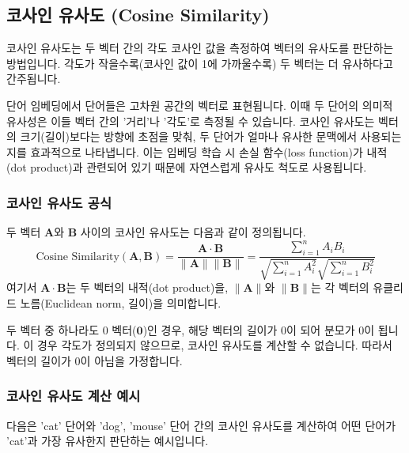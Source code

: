 \documentclass[11pt,a4paper]{article}
\begin{document}
\newpage
\subsection{코사인 유사도 (Cosine Similarity)}
코사인 유사도는 두 벡터 간의 각도 코사인 값을 측정하여 벡터의 유사도를 판단하는 방법입니다. 각도가 작을수록(코사인 값이 1에 가까울수록) 두 벡터는 더 유사하다고 간주됩니다.

\begin{tcolorbox}[title=\textbf{코사인 유사도의 중요성}]
단어 임베딩에서 단어들은 고차원 공간의 벡터로 표현됩니다. 이때 두 단어의 의미적 유사성은 이들 벡터 간의 '거리'나 '각도'로 측정될 수 있습니다. 코사인 유사도는 벡터의 크기(길이)보다는 방향에 초점을 맞춰, 두 단어가 얼마나 유사한 문맥에서 사용되는지를 효과적으로 나타냅니다. 이는 임베딩 학습 시 손실 함수(loss function)가 내적(dot product)과 관련되어 있기 때문에 자연스럽게 유사도 척도로 사용됩니다.
\end{tcolorbox}

\subsubsection{코사인 유사도 공식}
두 벡터 $\mathbf{A}$와 $\mathbf{B}$ 사이의 코사인 유사도는 다음과 같이 정의됩니다.
\begin{equation*}
\text{Cosine Similarity}(\mathbf{A}, \mathbf{B}) = \frac{\mathbf{A} \cdot \mathbf{B}}{\|\mathbf{A}\| \|\mathbf{B}\|} = \frac{\sum_{i=1}^{n} A_i B_i}{\sqrt{\sum_{i=1}^{n} A_i^2} \sqrt{\sum_{i=1}^{n} B_i^2}}
\end{equation*}
여기서 $\mathbf{A} \cdot \mathbf{B}$는 두 벡터의 내적(dot product)을, $\|\mathbf{A}\|$와 $\|\mathbf{B}\|$는 각 벡터의 유클리드 노름(Euclidean norm, 길이)을 의미합니다.

\begin{warningbox}[0 벡터의 문제]
두 벡터 중 하나라도 0 벡터($\mathbf{0}$)인 경우, 해당 벡터의 길이가 0이 되어 분모가 0이 됩니다. 이 경우 각도가 정의되지 않으므로, 코사인 유사도를 계산할 수 없습니다. 따라서 벡터의 길이가 0이 아님을 가정합니다.
\end{warningbox}

\subsubsection{코사인 유사도 계산 예시}
다음은 'cat' 단어와 'dog', 'mouse' 단어 간의 코사인 유사도를 계산하여 어떤 단어가 'cat'과 가장 유사한지 판단하는 예시입니다.
\end{document}
